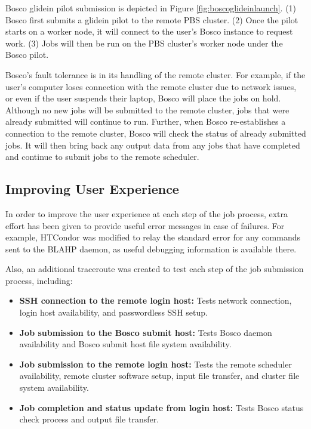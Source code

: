 \label{sec:boscoglidein}
Bosco glidein pilot submission is depicted in Figure \ref{fig:boscoglideinlaunch}.  (1) Bosco first submits a glidein pilot to the remote PBS cluster.  (2) Once the pilot starts on a worker node, it will connect to the user's Bosco instance to request work.  (3) Jobs will then be run on the PBS cluster's worker node under the Bosco pilot.

Bosco's fault tolerance is in its handling of the remote cluster.  For example, if the user's computer loses connection with the remote cluster due to network issues, or even if the user suspends their laptop, Bosco will place the jobs on hold.  Although no new jobs will be submitted to the remote cluster, jobs that were already submitted will continue to run.  Further, when Bosco re-establishes a connection to the remote cluster, Bosco will check the status of already submitted jobs.  It will then bring back any output data from any jobs that have completed and continue to submit jobs to the remote scheduler.

\subsection{Improving User Experience}


In order to improve the user experience at each step of the job process, extra effort has been given to provide useful error messages in case of failures.  For example, HTCondor was modified to relay the standard error for any commands sent to the BLAHP daemon, as useful debugging information is available there.  

\label{sec:boscotraceroute}

Also, an additional traceroute was created to test each step of the job submission process, including:

\begin{itemize}
\item \textbf{SSH connection to the remote login host:}  Tests network connection, login host availability, and passwordless SSH setup.
\item \textbf{Job submission to the Bosco submit host:}  Tests Bosco daemon availability and Bosco submit host file system availability.
\item \textbf{Job submission to the remote login host:}  Tests the remote scheduler availability, remote cluster software setup, input file transfer, and cluster file system availability.
\item \textbf{Job completion and status update from login host:}  Tests Bosco status check process and output file transfer.
\end{itemize}

